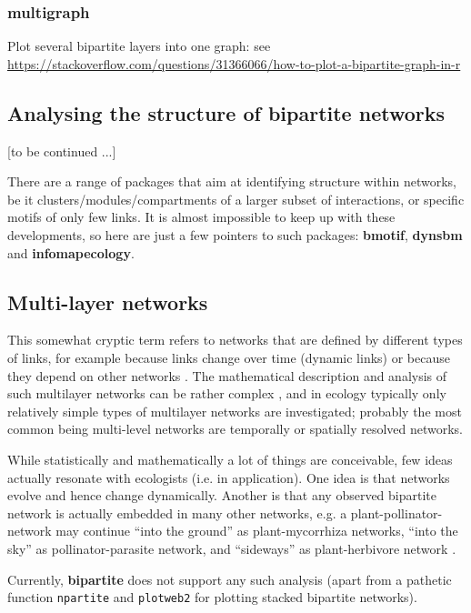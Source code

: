 \documentclass[a4paper, 11pt]{article}\usepackage[]{graphicx}\usepackage[dvipsnames]{xcolor}
\newcommand{\package}[1]{\textbf{#1}}
\newcommand{\code}[1]{\texttt{#1}}
\begin{document}
\subsubsection{\package{multigraph}}
Plot several bipartite layers into one graph: see \url{https://stackoverflow.com/questions/31366066/how-to-plot-a-bipartite-graph-in-r}



\subsection{Analysing the structure of bipartite networks}
[to be continued ...]

There are a range of packages that aim at identifying structure within networks, be it clusters/modules/compartments of a larger subset of interactions, or specific motifs of only few links. It is almost impossible to keep up with these developments, so here are just a few pointers to such packages: \package{bmotif}, \package{dynsbm} and \package{infomapecology}.


\subsection{Multi-layer networks}
This somewhat cryptic term refers to networks that are defined by different types of links, for example because links change over time (dynamic links) or because they depend on other networks \citep{Pilosof2017}. The mathematical description and analysis of such multilayer networks can be rather complex \citep{Aleta2019}, and in ecology typically only relatively simple types of multilayer networks are investigated; probably the most common being multi-level networks are temporally or spatially resolved networks.

While statistically and mathematically a lot of things are conceivable, few ideas actually resonate with ecologists (i.e. in application). One idea is that networks evolve and hence change dynamically. Another is that any observed bipartite network is actually embedded in many other networks, e.g. a plant-pollinator-network may continue ``into the ground'' as plant-mycorrhiza networks, ``into the sky'' as pollinator-parasite network, and ``sideways'' as plant-herbivore network \citep{Pocock2012}. 

Currently, \package{bipartite} does not support any such analysis (apart from a pathetic function \code{npartite} and \code{plotweb2} for plotting stacked bipartite networks).
\end{document}
